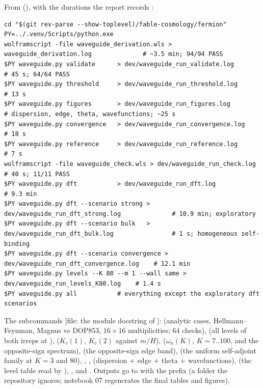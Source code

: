 From  (), with the durations the report
records :
\begin{Verbatim}[fontsize=\scriptsize]
cd "$(git rev-parse --show-toplevel)/fable-cosmology/fermion"
PY=../.venv/Scripts/python.exe
wolframscript -file waveguide_derivation.wls > waveguide_derivation.log              # ~3.5 min; 94/94 PASS
$PY waveguide.py validate      > dev/waveguide_run_validate.log                        # 45 s; 64/64 PASS
$PY waveguide.py threshold     > dev/waveguide_run_threshold.log                       # 13 s
$PY waveguide.py figures       > dev/waveguide_run_figures.log                         # dispersion, edge, theta, wavefunctions; ~25 s
$PY waveguide.py convergence   > dev/waveguide_run_convergence.log                     # 18 s
$PY waveguide.py reference     > dev/waveguide_run_reference.log                       # 7 s
wolframscript -file waveguide_check.wls > dev/waveguide_run_check.log                  # 40 s; 11/11 PASS
$PY waveguide.py dft           > dev/waveguide_run_dft.log                             # 9.3 min
$PY waveguide.py dft --scenario strong > dev/waveguide_run_dft_strong.log              # 10.9 min; exploratory
$PY waveguide.py dft --scenario bulk   > dev/waveguide_run_dft_bulk.log                # 1 s; homogeneous self-binding
$PY waveguide.py dft --scenario convergence > dev/waveguide_run_dft_convergence.log    # 12.1 min
$PY waveguide.py levels --K 80 --m 1 --wall same > dev/waveguide_run_levels_K80.log    # 1.4 s
$PY waveguide.py all           # everything except the exploratory dft scenarios
\end{Verbatim}
The subcommands [file: the module docstring of ]:  (analytic cases,
Hellmann--Feynman, Magnus vs DOP853, $16\times16$ multiplicities; 64 checks),  (all levels of both
irreps at ),  ($K_c(1)$, $K_c(2)$ against
$m/H$),  ($\omega_n(K)$, $K=7..100$, and the opposite-sign spectrum),  (the
opposite-sign edge band),  (the uniform self-adjoint family at $K=3$ and 80), ,
,  (dispersion + edge + theta + wavefunctions),  (the
level table read by ), ,
and . Outputs go to  with the prefix  (a folder the repository
ignores; notebook 07 regenerates the final tables and figures).

